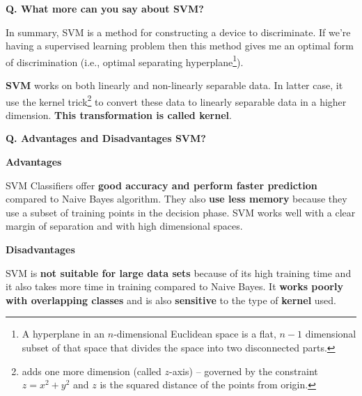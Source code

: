 \begin{frame}[fragile]{\textbf{Q. What more can you say about SVM?}}
  \vspace{.4em}
  \begin{wideitemize}
  \item In summary, SVM is a method for constructing a device to discriminate. If we're
    having a supervised learning problem then this method gives me an optimal
    form of discrimination (i.e., optimal separating hyperplane\footnote{A
      hyperplane in an $n$-dimensional Euclidean space is a flat, $n-1$
      dimensional subset of that space that divides the space into two
      disconnected parts.}).
  \item \textbf{SVM} works on both linearly and non-linearly separable data. In
    latter case, it use the kernel trick\footnote{adds one more dimension
      (called $z$-axis) -- governed by the constraint $z = x^2 + y^2$ and $z$ is
      the squared distance of the points from origin.} to convert these data to
    linearly separable data in a higher dimension. \textbf{This transformation is called kernel}.
  \end{wideitemize}

\end{frame}


\begin{frame}[fragile]{\textbf{Q. Advantages and Disadvantages SVM?}}
  \vspace{.4em}
  \begin{wideitemize}
  \item \textbf{Advantages}
    \begin{wideitemize}
    \item SVM Classifiers offer \textbf{good accuracy and perform faster prediction}
      compared to Naive Bayes algorithm. They also \textbf{use less memory} because they
      use a subset of training points in the decision phase. SVM works well with
      a clear margin of separation and with high dimensional spaces.
    \end{wideitemize}
  \item \textbf{Disadvantages}
    \begin{wideitemize}
    \item SVM is \textbf{not suitable for large data sets} because of its high training
      time and it also takes more time in training compared to Naive Bayes. It
      \textbf{works poorly with overlapping classes} and is also \textbf{sensitive} to the type
      of \textbf{kernel} used.
    \end{wideitemize}
  \end{wideitemize}
\end{frame}

